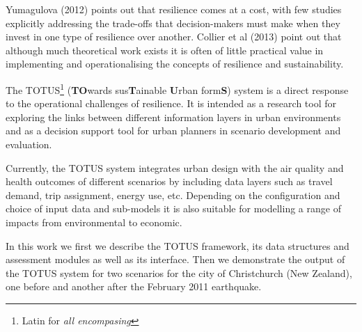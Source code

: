 Yumagulova (2012) points out that resilience comes at a cost, with few studies explicitly addressing the trade-offs that decision-makers must make when they invest in one type of resilience over another. Collier et al (2013) point out that although much theoretical work exists it is often of little practical value in implementing and operationalising the concepts of resilience and sustainability.

The TOTUS\footnote{Latin for \textit{all encompasing}} (\textbf{TO}wards sus\textbf{T}ainable \textbf{U}rban form\textbf{S}) system is a direct response to the operational challenges of resilience. It is intended as a research tool for exploring the links between different information layers in urban environments and as a decision support tool for urban planners in scenario development and evaluation.

Currently, the TOTUS system integrates urban design with the air quality and health outcomes of different scenarios by including data layers such as travel demand, trip assignment, energy use, etc. Depending on the configuration and choice of input data and sub-models it is also suitable for modelling a range of impacts from environmental to economic.

In this work we first we describe the TOTUS framework, its data structures and assessment modules as well as its interface. Then we demonstrate the output of the TOTUS system for two scenarios for the city of Christchurch (New Zealand), one before and another after the February 2011 earthquake.
